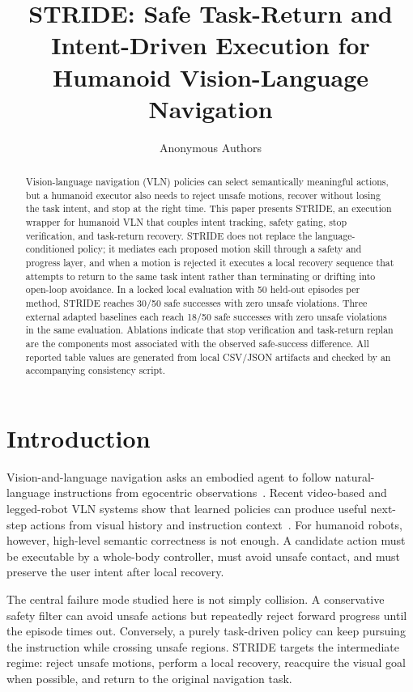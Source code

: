 \documentclass[letterpaper,10pt,conference]{ieeeconf}
\title{\LARGE \bf
STRIDE: Safe Task-Return and Intent-Driven Execution for Humanoid Vision-Language Navigation}
\author{Anonymous Authors}
\begin{document}
\maketitle
\thispagestyle{empty}
\pagestyle{empty}

\begin{abstract}
Vision-language navigation (VLN) policies can select semantically meaningful actions, but a humanoid executor also needs to reject unsafe motions, recover without losing the task intent, and stop at the right time. This paper presents STRIDE, an execution wrapper for humanoid VLN that couples intent tracking, safety gating, stop verification, and task-return recovery. STRIDE does not replace the language-conditioned policy; it mediates each proposed motion skill through a safety and progress layer, and when a motion is rejected it executes a local recovery sequence that attempts to return to the same task intent rather than terminating or drifting into open-loop avoidance. In a locked local evaluation with 50 held-out episodes per method, STRIDE reaches 30/50 safe successes with zero unsafe violations. Three external adapted baselines each reach 18/50 safe successes with zero unsafe violations in the same evaluation. Ablations indicate that stop verification and task-return replan are the components most associated with the observed safe-success difference. All reported table values are generated from local CSV/JSON artifacts and checked by an accompanying consistency script.
\end{abstract}

\section{Introduction}
Vision-and-language navigation asks an embodied agent to follow natural-language instructions from egocentric observations~\cite{anderson2018r2r}. Recent video-based and legged-robot VLN systems show that learned policies can produce useful next-step actions from visual history and instruction context~\cite{zhang2024navid,cheng2024navila}. For humanoid robots, however, high-level semantic correctness is not enough. A candidate action must be executable by a whole-body controller, must avoid unsafe contact, and must preserve the user intent after local recovery.

The central failure mode studied here is not simply collision. A conservative safety filter can avoid unsafe actions but repeatedly reject forward progress until the episode times out. Conversely, a purely task-driven policy can keep pursuing the instruction while crossing unsafe regions. STRIDE targets the intermediate regime: reject unsafe motions, perform a local recovery, reacquire the visual goal when possible, and return to the original navigation task.
\end{document}
